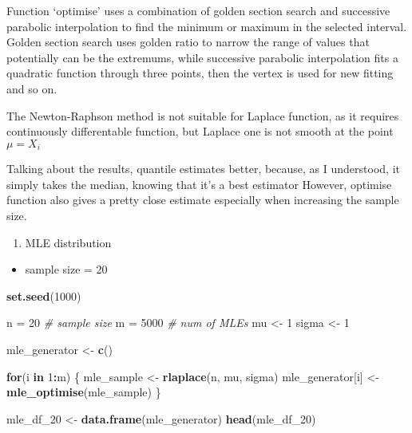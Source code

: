 \documentclass[
]{article}
\newenvironment{Shaded}{\begin{snugshade}}{\end{snugshade}}
\newcommand{\CommentTok}[1]{\textcolor[rgb]{0.56,0.35,0.01}{\textit{#1}}}
\newcommand{\ControlFlowTok}[1]{\textcolor[rgb]{0.13,0.29,0.53}{\textbf{#1}}}
\newcommand{\DecValTok}[1]{\textcolor[rgb]{0.00,0.00,0.81}{#1}}
\newcommand{\FunctionTok}[1]{\textcolor[rgb]{0.13,0.29,0.53}{\textbf{#1}}}
\newcommand{\NormalTok}[1]{#1}
\newcommand{\OtherTok}[1]{\textcolor[rgb]{0.56,0.35,0.01}{#1}}
\newcommand{\SpecialCharTok}[1]{\textcolor[rgb]{0.81,0.36,0.00}{\textbf{#1}}}
\providecommand{\tightlist}{%
  \setlength{\itemsep}{0pt}\setlength{\parskip}{0pt}}
\begin{document}
Function `optimise' uses a combination of golden section search and
successive parabolic interpolation to find the minimum or maximum in the
selected interval. Golden section search uses golden ratio to narrow the
range of values that potentially can be the extremums, while successive
parabolic interpolation fits a quadratic function through three points,
then the vertex is used for new fitting and so on.

The Newton-Raphson method is not suitable for Laplace function, as it
requires continuously differentable function, but Laplace one is not
smooth at the point \(\mu = X_i\)

Talking about the results, quantile estimates better, because, as I
understood, it simply takes the median, knowing that it's a best
estimator However, optimise function also gives a pretty close estimate
especially when increasing the sample size.

\begin{enumerate}
\def\labelenumi{\alph{enumi}.}
\setcounter{enumi}{3}
\tightlist
\item
  MLE distribution
\end{enumerate}

\begin{itemize}
\tightlist
\item
  sample size = 20
\end{itemize}

\begin{Shaded}
\begin{Highlighting}[]
\FunctionTok{set.seed}\NormalTok{(}\DecValTok{1000}\NormalTok{)}

\NormalTok{n }\OtherTok{=} \DecValTok{20} \CommentTok{\# sample size}
\NormalTok{m }\OtherTok{=} \DecValTok{5000} \CommentTok{\# num of MLEs}
\NormalTok{mu }\OtherTok{\textless{}{-}} \DecValTok{1}
\NormalTok{sigma }\OtherTok{\textless{}{-}} \DecValTok{1}

\NormalTok{mle\_generator }\OtherTok{\textless{}{-}} \FunctionTok{c}\NormalTok{()}

\ControlFlowTok{for}\NormalTok{(i }\ControlFlowTok{in} \DecValTok{1}\SpecialCharTok{:}\NormalTok{m) \{}
\NormalTok{  mle\_sample }\OtherTok{\textless{}{-}} \FunctionTok{rlaplace}\NormalTok{(n, mu, sigma)}
\NormalTok{  mle\_generator[i] }\OtherTok{\textless{}{-}} \FunctionTok{mle\_optimise}\NormalTok{(mle\_sample)}
\NormalTok{\}}

\NormalTok{mle\_df\_20 }\OtherTok{\textless{}{-}} \FunctionTok{data.frame}\NormalTok{(mle\_generator)}
\FunctionTok{head}\NormalTok{(mle\_df\_20)}
\end{Highlighting}
\end{Shaded}
\end{document}
